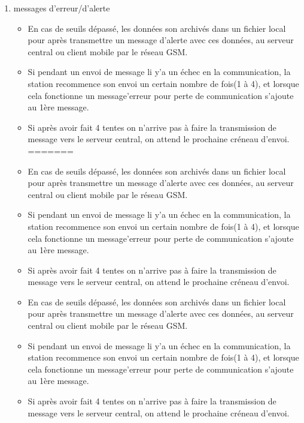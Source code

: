 \documentclass [a4paper] {report}
\begin{document}
\begin{description}
\begin{enumerate}
	\item messages d'erreur/d'alerte\\
		\begin{itemize}
<<<<<<< HEAD
		\item En cas de seuils dépassé, les données son archivés dans un fichier local pour après  transmettre un message d'alerte avec ces données, au serveur central ou client mobile par le réseau GSM. \\
		\item Si pendant un envoi de message li y'a un échec en la communication, la station recommence son envoi un certain nombre de fois(1 à 4), et lorsque cela fonctionne un message'erreur pour perte de communication s'ajoute au 1ère message.\\
		\item Si après avoir fait 4 tentes on n'arrive pas à faire la transmission de message vers le serveur central, on attend le prochaine créneau d'envoi.\\
=======

		\item En cas de seuils dépassé, les données son archivés dans un fichier local pour après  transmettre
		 un message d'alerte avec ces données, au serveur central ou client mobile par le réseau GSM. \\
		\item Si pendant un envoi de message li y'a un échec en la communication, la station recommence son envoi
		 un certain nombre de fois(1 à 4), et lorsque cela fonctionne un message'erreur pour perte de communication
		  s'ajoute au 1ère message.\\
		\item Si après avoir fait 4 tentes on n'arrive pas à faire la transmission de message vers le serveur central, on
		 attend le prochaine créneau d'envoi.\\

		\item En cas de seuils dépassé, les données son archivés dans un fichier local pour après  transmettre un message d'alerte avec ces données, au serveur central ou client mobile par le réseau GSM. \\
		\item Si pendant un envoi de message li y'a un échec en la communication, la station recommence son envoi un certain nombre de fois(1 à 4), et lorsque cela fonctionne un message'erreur pour perte de communication s'ajoute au 1ère message.\\
		\item Si après avoir fait 4 tentes on n'arrive pas à faire la transmission de message vers le serveur central, on attend le prochaine créneau d'envoi.\\


\end{itemize}
\end{enumerate}
\end{description}
\end{document}
